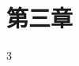 \documentclass[supercite]{../upcthesis}
\begin{document}
\fi

\section{第三章}

3





\ifx\compileAllFiles\undefined
\end{document}

